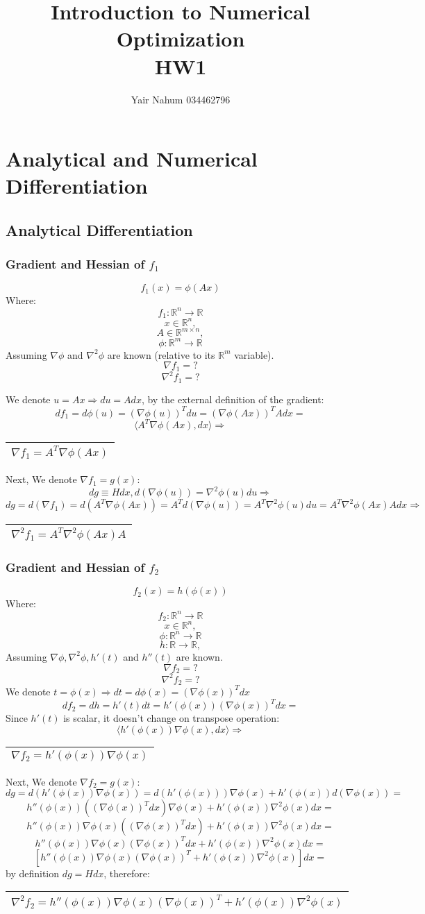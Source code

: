 \documentclass{article}
\title{Introduction to Numerical Optimization\\HW1}
\author{Yair Nahum 034462796 }
\newcommand{\rectres}[1]{
\begin{center}
\begin{tabular}{ |c| }
\hline
 #1\\
\hline
\end{tabular}
\end{center}
}
\begin{document}
\maketitle


\section{Analytical and Numerical Differentiation}

\subsection{Analytical Differentiation}

\subsubsection{Gradient and Hessian of $f_1$}
$$f_1(x)=\phi(Ax)$$
Where:
$$f_1:\mathbb{R}^n \rightarrow \mathbb{R}$$
$$x \in \mathbb{R}^{n},$$
$$A \in \mathbb{R}^{m\times n},$$
$$\phi:\mathbb{R}^m \rightarrow \mathbb{R}$$
Assuming $\nabla\phi$ and $\nabla^2\phi$ are known (relative to its $\mathbb{R}^m$ variable).
$$\nabla f_1 = ?$$
$$\nabla^2 f_1 = ?$$

We denote $u=Ax \Rightarrow du=Adx$, by the external definition of the gradient:
$$df_1=d\phi(u)=(\nabla\phi(u))^T du = (\nabla\phi(Ax))^T A dx = $$
$$ \langle A^T\nabla \phi(Ax), dx \rangle \Rightarrow $$
\rectres{$\nabla f_1 = A^T\nabla \phi(Ax)$}
Next, We denote $\nabla f_1= g(x)$:
$$dg\equiv Hdx,d(\nabla \phi(u)) =  \nabla^2 \phi(u) du \Rightarrow$$
$$dg=d(\nabla f_1) = d(A^T\nabla \phi(Ax))=A^Td(\nabla \phi(u))=A^T\nabla^2 \phi(u) du = A^T\nabla^2 \phi(Ax) A dx \Rightarrow$$
\rectres{$\nabla^2 f_1 = A^T\nabla^2 \phi(Ax) A$}

\subsubsection{Gradient and Hessian of $f_2$}
$$f_2(x)=h(\phi(x))$$
Where:
$$f_2:\mathbb{R}^n \rightarrow \mathbb{R}$$
$$x \in \mathbb{R}^{n},$$
$$\phi:\mathbb{R}^n \rightarrow \mathbb{R}$$
$$h:\mathbb{R} \rightarrow \mathbb{R},$$
Assuming $\nabla\phi, \nabla^2\phi, h'(t)$ and $h''(t)$ are known.
$$\nabla f_2 = ?$$
$$\nabla^2 f_2 = ?$$
We denote $t=\phi(x)\Rightarrow dt=d\phi(x)=(\nabla \phi(x))^Tdx$
$$df_2= dh = h'(t)dt = h'(\phi(x))(\nabla \phi(x))^Tdx=$$
Since $h'(t)$ is scalar, it doesn't change on transpose operation:
$$\langle h'(\phi(x))\nabla \phi(x), dx \rangle \Rightarrow$$
\rectres{$\nabla f_2 = h'(\phi(x))\nabla \phi(x)$}
Next, We denote $\nabla f_2= g(x)$:
$$dg = d(h'(\phi(x))\nabla \phi(x)) =  d(h'(\phi(x)))\nabla \phi(x) + h'(\phi(x))d(\nabla \phi(x))=$$
$$h''(\phi(x))((\nabla \phi(x))^Tdx)\nabla \phi(x) + h'(\phi(x))\nabla^2 \phi(x)dx=$$
$$h''(\phi(x))\nabla \phi(x)((\nabla \phi(x))^Tdx) + h'(\phi(x))\nabla^2 \phi(x)dx=$$
$$h''(\phi(x))\nabla \phi(x)(\nabla \phi(x))^Tdx + h'(\phi(x))\nabla^2 \phi(x)dx=$$
$$[h''(\phi(x))\nabla \phi(x)(\nabla \phi(x))^T + h'(\phi(x))\nabla^2 \phi(x)]dx=$$
by definition $dg=Hdx$, therefore:
\rectres{$\nabla^2 f_2 = h''(\phi(x))\nabla \phi(x)(\nabla \phi(x))^T + h'(\phi(x))\nabla^2 \phi(x)$}
\newpage
\end{document}
